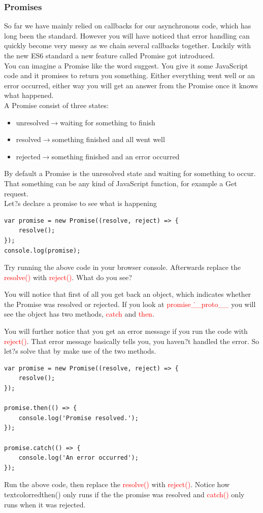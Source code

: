 \documentclass[a4paper]{article}
\begin{document}
\subsubsection{Promises}
So far we have mainly relied on callbacks for our asynchronous code, which has long been the standard. However you will have noticed that error handling can quickly become very messy as we chain several callbacks together. Luckily with the new ES6 standard a new feature called Promise got introduced. \\

You can imagine a Promise like the word suggest. You give it some JavaScript code and it promises to return you something. Either everything went well or an error occurred, either way you will get an answer from the Promise once it knows what happened.\\

A Promise consist of three states:
\begin{itemize}
\item unresolved$\rightarrow$waiting for something to finish
\item resolved$\rightarrow$something finished and all went well
\item rejected$\rightarrow$something finished and an error occurred
\end{itemize}

By default a Promise is the unresolved state and waiting for something to occur. That something can be any kind of JavaScript function, for example a Get request.\\

Let?s declare a promise to see what is happening

\begin{lstlisting}
var promise = new Promise((resolve, reject) => {
    resolve();
});
console.log(promise);
\end{lstlisting}
Try running the above code in your browser console. Afterwards replace the \textcolor{red}{resolve()} with \textcolor{red}{reject()}. What do you see?

You will notice that first of all you get back an object, which indicates whether the Promise was resolved or rejected. If you look at \textcolor{red}{promise\.\_\_proto\_\_} you will see the object has two methods, \textcolor{red}{catch} and \textcolor{red}{then}.

You will further notice that you get an error message if you run the code with \textcolor{red}{reject()}. That error message basically tells you, you haven?t handled the error. So let?s solve that by make use of the two methods.
\begin{lstlisting}
var promise = new Promise((resolve, reject) => {
    resolve();
});

promise.then(() => {
    console.log('Promise resolved.');
});

promise.catch(() => {
    console.log('An error occurred');
});
\end{lstlisting}
Run the above code, then replace the \textcolor{red}{resolve()} with \textcolor{red}{reject()}. Notice how textcolor{red}{then()} only runs if the the promise was resolved and \textcolor{red}{catch()} only runs when it was rejected.
\end{document}
